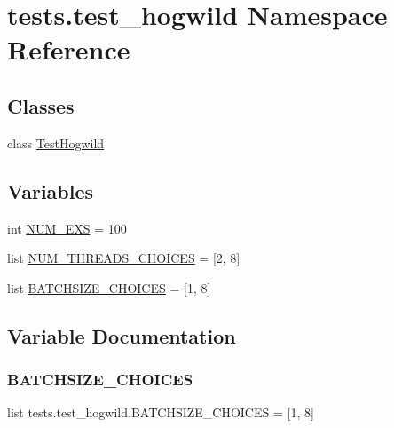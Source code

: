 \hypertarget{namespacetests_1_1test__hogwild}{}\section{tests.\+test\+\_\+hogwild Namespace Reference}
\label{namespacetests_1_1test__hogwild}
\subsection*{Classes}
\begin{DoxyCompactItemize}
\item 
class \hyperlink{classtests_1_1test__hogwild_1_1TestHogwild}{Test\+Hogwild}
\end{DoxyCompactItemize}
\subsection*{Variables}
\begin{DoxyCompactItemize}
\item 
int \hyperlink{namespacetests_1_1test__hogwild_a7d6d1b096d23ad4ee58574b9eb82f891}{N\+U\+M\+\_\+\+E\+XS} = 100
\item 
list \hyperlink{namespacetests_1_1test__hogwild_a487945cdbcdd386aa4aa417ad7c1a100}{N\+U\+M\+\_\+\+T\+H\+R\+E\+A\+D\+S\+\_\+\+C\+H\+O\+I\+C\+ES} = \mbox{[}2, 8\mbox{]}
\item 
list \hyperlink{namespacetests_1_1test__hogwild_a69c8bbe8ac724b49216e95f37eff368f}{B\+A\+T\+C\+H\+S\+I\+Z\+E\+\_\+\+C\+H\+O\+I\+C\+ES} = \mbox{[}1, 8\mbox{]}
\end{DoxyCompactItemize}


\subsection{Variable Documentation}
\mbox{\label{namespacetests_1_1test__hogwild_a69c8bbe8ac724b49216e95f37eff368f}} 
\subsubsection{\texorpdfstring{B\+A\+T\+C\+H\+S\+I\+Z\+E\+\_\+\+C\+H\+O\+I\+C\+ES}{BATCHSIZE\_CHOICES}}
{\footnotesize\ttfamily list tests.\+test\+\_\+hogwild.\+B\+A\+T\+C\+H\+S\+I\+Z\+E\+\_\+\+C\+H\+O\+I\+C\+ES = \mbox{[}1, 8\mbox{]}}

